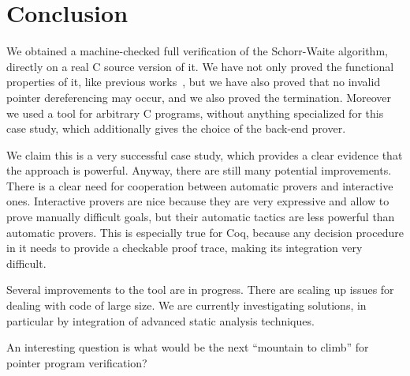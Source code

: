 \section{Conclusion}
\label{sec:conclusion}

We obtained a machine-checked full verification of the Schorr-Waite
algorithm, directly on a real C source version of it. We have not only
proved the functional properties of it, like previous
works~\cite{bornat00mpc,mehta03cade}, but we have also proved that no
invalid pointer dereferencing may occur, and we also proved the
termination. Moreover we used a tool for arbitrary C programs, without
anything specialized for this case study, which additionally gives the
choice of the back-end prover.

We claim this is a very successful case study, which provides a clear
evidence that the \caduceus{} approach is powerful. Anyway, there are
still many potential improvements. There is a clear need for
cooperation between automatic provers and interactive
ones. Interactive provers are nice because they are very expressive
and allow to prove manually difficult goals, but their automatic
tactics are less powerful than automatic provers. This is especially
true for Coq, because any decision procedure in it needs to provide a
checkable proof trace, making its integration very difficult.

Several improvements to the \caduceus{} tool are in progress. There are
scaling up issues for dealing with code of large size. We are
currently investigating solutions, in particular by integration of
advanced static analysis techniques.

An interesting question is what would be the next ``mountain to
climb'' for pointer program verification?


